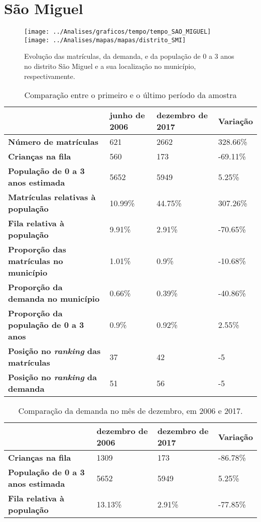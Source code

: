 \section{São Miguel}
\begin{figure}[H]
	\centering
	\texttt{[image: ../Analises/graficos/tempo/tempo\_SAO\_MIGUEL]}
	\texttt{[image: ../Analises/mapas/mapas/distrito\_SMI]}
	\caption{Evolução das matrículas, da demanda, e da população de 0 a 3 anos no distrito São Miguel e a sua localização no município, respectivamente.}
\end{figure}
\begin{table}[H]
	\begin{tabular}{|l|l|l|l|}
		\hline
		\textbf{}                                      & \textbf{junho de 2006}       & \textbf{dezembro de 2017}    & \textbf{Variação} \\ \hline
		\textbf{Número de matrículas}                  & 621 & 2662 & 328.66\% \\ \hline
		\textbf{Crianças na fila}                      & 560 & 173 & -69.11\% \\ \hline
		\textbf{População de 0 a 3 anos estimada}      & 5652 & 5949 & 5.25\% \\ \hline
		\textbf{Matrículas relativas à população}      & 10.99\% & 44.75\% & 307.26\% \\ \hline
		\textbf{Fila relativa à população}             & 9.91\% & 2.91\% & -70.65\% \\ \hline
		\textbf{Proporção das matrículas no município} & 1.01\% & 0.9\% & -10.68\% \\ \hline
		\textbf{Proporção da demanda no município}     & 0.66\% & 0.39\% & -40.86\% \\ \hline
		\textbf{Proporção da população de 0 a 3 anos}  & 0.9\% & 0.92\% & 2.55\% \\ \hline
		\textbf{Posição no \textit{ranking} das matrículas}     & 37 & 42 & -5 \\ \hline
		\textbf{Posição no \textit{ranking} da demanda}         & 51 & 56 & -5 \\ \hline
	\end{tabular}
	\caption{Comparação entre o primeiro e o último período da amostra}
\end{table}
\begin{table}[H]
	\begin{tabular}{|l|l|l|l|}
		\hline
		\textbf{}                                 & \textbf{dezembro de 2006} & \textbf{dezembro de 2017} & \textbf{Variação} \\ \hline
		\textbf{Crianças na fila}                      & 1309 & 173 & -86.78\% \\ \hline
		\textbf{População de 0 a 3 anos estimada}      & 5652 & 5949 & 5.25\% \\ \hline
		\textbf{Fila relativa à população}             & 13.13\% & 2.91\% & -77.85\% \\ \hline
	\end{tabular}
	\caption{Comparação da demanda no mês de dezembro, em 2006 e 2017.}
\end{table}
